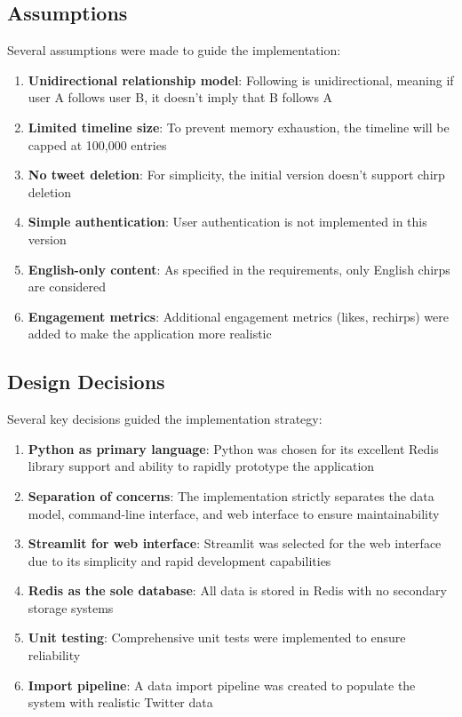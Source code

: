 \documentclass[a4paper,11pt]{article}
\begin{document}
\subsection{Assumptions}
Several assumptions were made to guide the implementation:

\begin{enumerate}
    \item \textbf{Unidirectional relationship model}: Following is unidirectional, meaning if user A follows user B, it doesn't imply that B follows A
    \item \textbf{Limited timeline size}: To prevent memory exhaustion, the timeline will be capped at 100,000 entries
    \item \textbf{No tweet deletion}: For simplicity, the initial version doesn't support chirp deletion
    \item \textbf{Simple authentication}: User authentication is not implemented in this version
    \item \textbf{English-only content}: As specified in the requirements, only English chirps are considered
    \item \textbf{Engagement metrics}: Additional engagement metrics (likes, rechirps) were added to make the application more realistic
\end{enumerate}

\subsection{Design Decisions}
Several key decisions guided the implementation strategy:

\begin{enumerate}
    \item \textbf{Python as primary language}: Python was chosen for its excellent Redis library support and ability to rapidly prototype the application
    \item \textbf{Separation of concerns}: The implementation strictly separates the data model, command-line interface, and web interface to ensure maintainability
    \item \textbf{Streamlit for web interface}: Streamlit was selected for the web interface due to its simplicity and rapid development capabilities
    \item \textbf{Redis as the sole database}: All data is stored in Redis with no secondary storage systems
    \item \textbf{Unit testing}: Comprehensive unit tests were implemented to ensure reliability
    \item \textbf{Import pipeline}: A data import pipeline was created to populate the system with realistic Twitter data
\end{enumerate}
\end{document}
